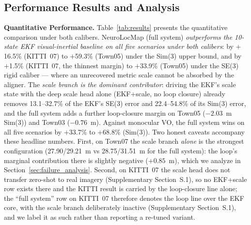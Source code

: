\subsection{Performance Results and Analysis}

\textbf{Quantitative Performance.} Table~\ref{tab:results} presents the quantitative comparison under both calibers. NeuroLocMap (full system) \emph{outperforms the 10-state EKF visual-inertial baseline on all five scenarios under both calibers}: by $+$16.5\% (KITTI~07) to $+$59.3\% (Town05) under the Sim(3) upper bound, and by $+$1.5\% (KITTI~07, the thinnest margin) to $+$33.9\% (Town05) under the SE(3) rigid caliber --- where an unrecovered metric scale cannot be absorbed by the aligner. The \emph{scale branch is the dominant contributor}: driving the EKF's scale state with the deep scale head alone (EKF+scale, no loop closure) already removes 13.1--32.7\% of the EKF's SE(3) error and 22.4--54.8\% of its Sim(3) error, and the full system adds a further loop-closure margin on Town05 ($-2.03$~m Sim(3)) and Town03 ($-0.76$~m). Against monocular VO, the full system wins on all five scenarios by $+$33.7\% to $+$68.8\% (Sim(3)). Two honest caveats accompany these headline numbers. First, on Town07 the scale branch \emph{alone} is the strongest configuration (27.90/29.21~m vs 28.75/31.51~m for the full system): the loop's marginal contribution there is slightly negative ($+0.85$~m), which we analyze in Section~\ref{sec:failure_analysis}. Second, on KITTI~07 the scale head does not transfer zero-shot to real imagery (Supplementary Section~S.1), so no EKF+scale row exists there and the KITTI result is carried by the loop-closure line alone; the ``full system'' row on KITTI~07 therefore denotes the loop line over the EKF core, with the scale branch deliberately inactive (Supplementary Section~S.1), and we label it as such rather than reporting a re-tuned variant.

